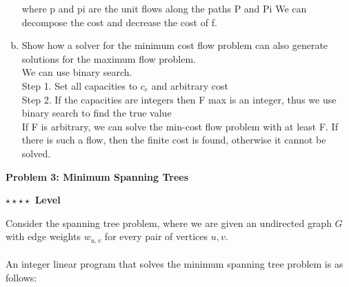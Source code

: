 \documentclass{article}\usepackage[utf8]{inputenc}\usepackage[margin=0.4cm,top=0.4cm,bottom=0.4cm]{geometry}\usepackage[usenames,dvipsnames,svgnames,table]{xcolor}
\begin{document}
\begin{enumerate}[(a)]
where p and pi are the unit flows along the paths P and Pi
We can decompose the cost and decrease the cost of f.
\EndSolution
\item Show how a solver for the minimum cost flow problem can also generate solutions for the maximum flow problem.
\BeginSolution %
\\
We can use binary search.\\
Step 1. Set all capacities to $c_e$ and arbitrary cost\\
Step 2. If the capacities are integers then F max is an integer, thus we use binary search to find the true value\\
If F is arbitrary, we can solve the min-cost flow problem with at least F. If there is such a flow, then the finite cost is found, otherwise it cannot be solved.
\EndSolution
\end{enumerate}
\clearpage

\vspace{-2mm}\noindent\begin{mybox}{\begin{center}\textbf{\color{black}Problem 3: Minimum Spanning Trees}\end{center}}\end{mybox}\vspace{-2mm}
\begin{myboxot}\noindent\textbf{$\star\star\star\star$ Level}\end{myboxot} 

\noindent Consider the spanning tree problem, where we are given an undirected graph $G$ with edge weights $w_{u,v}$ for every pair of vertices $u, v$.
\\\\
\noindent An integer linear program that solves the minimum spanning tree problem is as follows:
\end{document}

